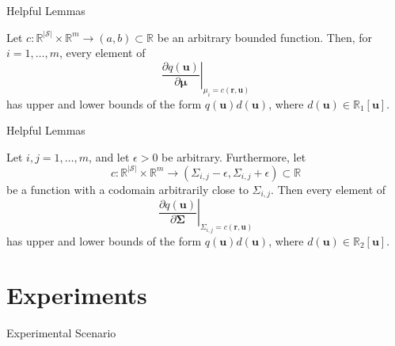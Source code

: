 \documentclass{beamer}
\begin{document}
\begin{frame}{Helpful Lemmas}
  \begin{lemma}
    Let $c : \mathbb{R}^{|\mathcal{S}|} \times \mathbb{R}^m \to (a, b) \subset
    \mathbb{R}$ be an arbitrary bounded function. Then, for $i = 1, \dots, m$,
    every element of
    \[
      \left. \frac{\partial q(\mathbf{u})}{\partial \bm\mu} \right|_{\mu_i =
        c(\mathbf{r}, \mathbf{u})}
    \]
    has upper and lower bounds of the form $q(\mathbf{u})d(\mathbf{u})$,
    where $d(\mathbf{u}) \in \mathbb{R}_1[\mathbf{u}]$.
  \end{lemma}
\end{frame}

\begin{frame}{Helpful Lemmas}
  \begin{lemma} \label{lemma:bound3}
    Let $i, j = 1, \dots, m$, and let $\epsilon > 0$ be arbitrary. Furthermore,
    let
    \[
      c : \mathbb{R}^{|\mathcal{S}|} \times \mathbb{R}^m \to (\Sigma_{i,j} - \epsilon,
      \Sigma_{i,j} + \epsilon) \subset \mathbb{R}
    \]
    be a function with a codomain arbitrarily close to $\Sigma_{i,j}$. Then every
    element of
    \[
      \left. \frac{\partial q(\mathbf{u})}{\partial \bm\Sigma} \right|_{\Sigma_{i,j} =
        c(\mathbf{r}, \mathbf{u})}
    \]
    has upper and lower bounds of the form $q(\mathbf{u})d(\mathbf{u})$, where
    $d(\mathbf{u}) \in \mathbb{R}_2[\mathbf{u}]$.
  \end{lemma}
\end{frame}

\section{Experiments}

\begin{frame}{Experimental Scenario}
  \begin{figure}
    \centering
  \end{figure}
\end{frame}
\end{document}
